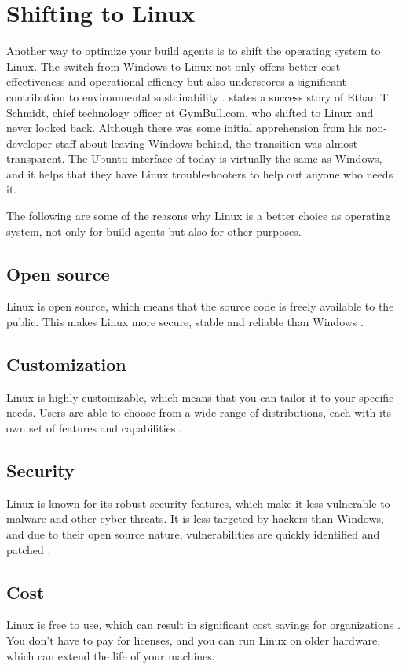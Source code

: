 \section{Shifting to Linux}
Another way to optimize your build agents is to shift the operating system to Linux. 
The switch from Windows to Linux not only offers better cost-effectiveness and operational effiency but also underscores a significant contribution to environmental sustainability \autocite{medium}.
\textcite{medium} states a success story of Ethan T. Schmidt, chief technology officer at GymBull.com, who shifted to Linux and never looked back.
Although there was some initial apprehension from his non-developer staff about leaving Windows behind, the transition was almost transparent. 
The Ubuntu interface of today is virtually the same as Windows, and it helps that they have Linux troubleshooters to help out anyone who needs it. 

The following are some of the reasons why Linux is a better choice as operating system, not only for build agents but also for other purposes.

\subsection{Open source}
Linux is open source, which means that the source code is freely available to the public. 
This makes Linux more secure, stable and reliable than Windows \autocite{linkedin2}.

\subsection{Customization}
Linux is highly customizable, which means that you can tailor it to your specific needs. 
Users are able to choose from a wide range of distributions, each with its own set of features and capabilities \autocite{linkedin2}.

\subsection{Security}
Linux is known for its robust security features, which make it less vulnerable to malware and other cyber threats.
It is less targeted by hackers than Windows, and due to their open source nature, vulnerabilities are quickly identified and patched \autocite{linkedin2}.

\subsection{Cost}
Linux is free to use, which can result in significant cost savings for organizations \autocite{linkedin2}. 
You don't have to pay for licenses, and you can run Linux on older hardware, which can extend the life of your machines.

